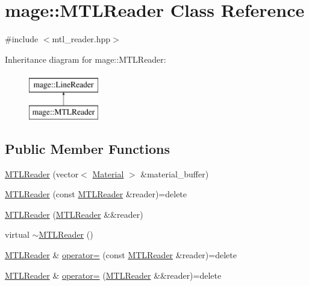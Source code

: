 \hypertarget{classmage_1_1_m_t_l_reader}{}\section{mage\+:\+:M\+T\+L\+Reader Class Reference}
\label{classmage_1_1_m_t_l_reader}


{\ttfamily \#include $<$mtl\+\_\+reader.\+hpp$>$}

Inheritance diagram for mage\+:\+:M\+T\+L\+Reader\+:\begin{figure}[H]
\begin{center}
\leavevmode
\includegraphics[height=2.000000cm]{classmage_1_1_m_t_l_reader}
\end{center}
\end{figure}
\subsection*{Public Member Functions}
\begin{DoxyCompactItemize}
\item 
\hyperlink{classmage_1_1_m_t_l_reader_a924f813cca170e2592a6e7d2a3255be8}{M\+T\+L\+Reader} (vector$<$ \hyperlink{classmage_1_1_material}{Material} $>$ \&material\+\_\+buffer)
\item 
\hyperlink{classmage_1_1_m_t_l_reader_adcc57156298b2198c24c041503df2e6d}{M\+T\+L\+Reader} (const \hyperlink{classmage_1_1_m_t_l_reader}{M\+T\+L\+Reader} \&reader)=delete
\item 
\hyperlink{classmage_1_1_m_t_l_reader_a415057f591e54e91658c77092b7b2d4e}{M\+T\+L\+Reader} (\hyperlink{classmage_1_1_m_t_l_reader}{M\+T\+L\+Reader} \&\&reader)
\item 
virtual \hyperlink{classmage_1_1_m_t_l_reader_a9d3216b2637bc9402d37c7438860f542}{$\sim$\+M\+T\+L\+Reader} ()
\item 
\hyperlink{classmage_1_1_m_t_l_reader}{M\+T\+L\+Reader} \& \hyperlink{classmage_1_1_m_t_l_reader_ae239ac085326919918a418edabcafeae}{operator=} (const \hyperlink{classmage_1_1_m_t_l_reader}{M\+T\+L\+Reader} \&reader)=delete
\item 
\hyperlink{classmage_1_1_m_t_l_reader}{M\+T\+L\+Reader} \& \hyperlink{classmage_1_1_m_t_l_reader_aa777389ff4a3cd2f1df2cbf5c6da708e}{operator=} (\hyperlink{classmage_1_1_m_t_l_reader}{M\+T\+L\+Reader} \&\&reader)=delete
\end{DoxyCompactItemize}
